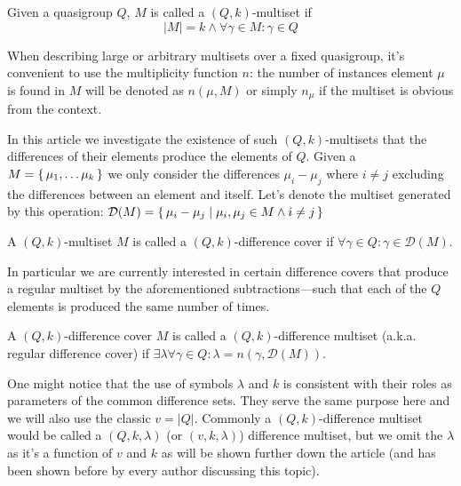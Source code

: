 \begin{definition}
    \label{dms:def:ms}
    Given a quasigroup $Q$, $M$ is called a $(Q,k)$-multiset if
    \begin{equation}
        |M| = k \land \forall \gamma \in M \colon \gamma \in Q
    \end{equation}
\end{definition}

When describing large or arbitrary multisets over a fixed quasigroup, it's convenient to use the multiplicity function $n$: the number of instances element $\mu$ is found in $M$ will be denoted as $n(\mu,M)$ or simply $n_\mu$ if the multiset is obvious from the context.

In this article we investigate the existence of such $(Q,k)$-multisets that the differences of their elements produce the elements of $Q$. Given a $M=\set{\mu_1,\ldots \mu_k}$ we only consider the differences $\mu_i-\mu_j$ where $i \neq j$ excluding the differences between an element and itself. Let's denote the multiset generated by this operation: $\mathcal D (M) = \set{\mu_i-\mu_j \mid \mu_i, \mu_j \in M \land i \neq j}$

\begin{definition}
    \label{dms:def:dc}
    A $(Q,k)$-multiset $M$ is called a $(Q,k)$-difference cover if $\forall \gamma \in Q \colon \gamma \in \mathcal D(M)$.
\end{definition}

In particular we are currently interested in certain difference covers that produce a regular multiset by the aforementioned subtractions---such that each of the $Q$ elements is produced the same number of times.

\begin{definition}
    \label{dms:def:dms}
    A $(Q,k)$-difference cover $M$ is called a $(Q,k)$-difference multiset (a.k.a. regular difference cover) if $\exists \lambda  \forall \gamma \in Q \colon \lambda = n(\gamma, \mathcal D(M))$.
\end{definition}

One might notice that the use of symbols $\lambda$ and $k$ is consistent with their roles as parameters of the common difference sets. They serve the same purpose here and we will also use the classic $v = |Q|$. Commonly a $(Q,k)$-difference multiset would be called a $(Q,k,\lambda)$ (or $(v,k,\lambda)$) difference multiset, but we omit the $\lambda$ as it's a function of $v$ and $k$ as will be shown further down the article (and has been shown before by every author discussing this topic).

